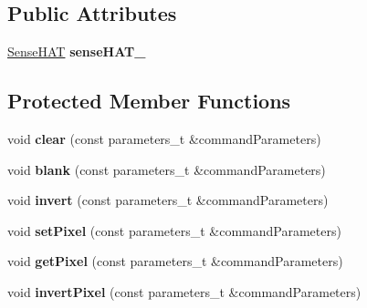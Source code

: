 \subsection*{Public Attributes}
\begin{DoxyCompactItemize}
\item 
\mbox{\label{class_m_q_t_t_client_a7e94085d9a98bc589f9dc821a8fe7eae}} 
\mbox{\hyperlink{class_sense_h_a_t}{Sense\+H\+AT}} {\bfseries sense\+H\+A\+T\+\_\+}
\end{DoxyCompactItemize}
\subsection*{Protected Member Functions}
\begin{DoxyCompactItemize}
\item 
\mbox{\label{class_m_q_t_t_client_a7b915fa050519ff3d2933d9e2d89d5a1}} 
void {\bfseries clear} (const parameters\+\_\+t \&command\+Parameters)
\item 
\mbox{\label{class_m_q_t_t_client_a846cc506bc2dac0d0b72ed4ba0fe1ce4}} 
void {\bfseries blank} (const parameters\+\_\+t \&command\+Parameters)
\item 
\mbox{\label{class_m_q_t_t_client_a5957024b86a149d23925447d0c8a0b59}} 
void {\bfseries invert} (const parameters\+\_\+t \&command\+Parameters)
\item 
\mbox{\label{class_m_q_t_t_client_a143fef39e18fde6cd2b950a510d469e1}} 
void {\bfseries set\+Pixel} (const parameters\+\_\+t \&command\+Parameters)
\item 
\mbox{\label{class_m_q_t_t_client_a1a9be7281338011a7c57f621c105ce1b}} 
void {\bfseries get\+Pixel} (const parameters\+\_\+t \&command\+Parameters)
\item 
\mbox{\label{class_m_q_t_t_client_a97a40fb59952a4af1416d2ed2c9c0285}} 
void {\bfseries invert\+Pixel} (const parameters\+\_\+t \&command\+Parameters)
\item 
\mbox{\label{class_m_q_t_t_client_a5e5611949e2dfd6505b799bf2e528939}} 

\end{DoxyCompactItemize}
